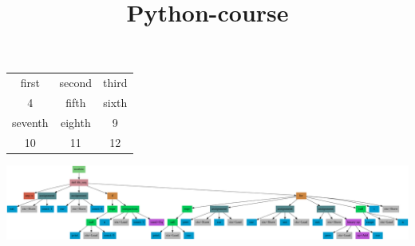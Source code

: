 \documentclass{article}
\title{Python-course}
\begin{document}
\maketitle
\begin{center}
\begin{tabular}{c c c }
first & second & third \\
4 & fifth & sixth \\
seventh & eighth & 9 \\
10 & 11 & 12 \\

\end{tabular}
\end{center}
\begin{center}
\includegraphics[width=1\textwidth]{artifacts/fib_ast.png}
\end{center}
\end{document}
